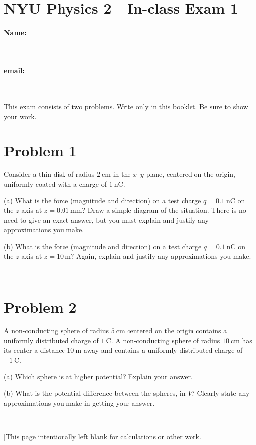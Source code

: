 \documentclass[12pt]{article}
\begin{document}
\section*{NYU Physics 2---In-class Exam 1}

\vfill

\paragraph{Name:} ~
\paragraph{email:} ~

\vfill
\noindent
\resizebox{\textwidth}{!}{}
\vfill

This exam consists of two problems.  Write only in this booklet.  Be
sure to show your work.

\clearpage

\section*{Problem 1}

Consider a thin disk of radius $2~\mathrm{cm}$ in the $x$--$y$ plane,
centered on the origin, uniformly coated with a charge of
$1~\mathrm{nC}$.

(a) What is the force (magnitude and direction) on a test charge
$q=0.1~\mathrm{nC}$ on the $z$ axis at $z=0.01~\mathrm{mm}$?  Draw a
simple diagram of the situation.  There is no need to give an exact
answer, but you must explain and justify any approximations you make.

\vfill

(b) What is the force (magnitude and direction) on a test charge
$q=0.1~\mathrm{nC}$ on the $z$ axis at $z=10~\mathrm{m}$?  Again,
explain and justify any approximations you make.

\vfill ~

\clearpage

\section*{Problem 2}

A non-conducting sphere of radius $5~\mathrm{cm}$ centered on the
origin contains a uniformly distributed charge of $1~\mathrm{C}$.  A
non-conducting sphere of radius $10~\mathrm{cm}$ has its center a
distance $10~\mathrm{m}$ away and contains a uniformly distributed
charge of $-1~\mathrm{C}$.

(a) Which sphere is at higher potential?  Explain your answer.

\vfill

(b) What is the potential difference between the spheres, in $V$?
Clearly state any approximations you make in getting your answer.

\vfill ~

\clearpage

[This page intentionally left blank for calculations or other work.]
\end{document}
